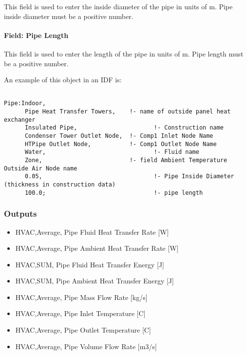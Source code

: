 This field is used to enter the inside diameter of the pipe in units of m. Pipe inside diameter must be a positive number.

\paragraph{Field: Pipe Length}\label{field-pipe-length-000}

This field is used to enter the length of the pipe in units of m. Pipe length must be a positive number.

An example of this object in an IDF is:

\begin{lstlisting}

Pipe:Indoor,
      Pipe Heat Transfer Towers,    !- name of outside panel heat exchanger
      Insulated Pipe,                      !- Construction name
      Condenser Tower Outlet Node,  !- Comp1 Inlet Node Name
      HTPipe Outlet Node,           !- Comp1 Outlet Node Name
      Water,                               !- Fluid name
      Zone,                         !- field Ambient Temperature Outside Air Node name
      0.05,                                !- Pipe Inside Diameter (thickness in construction data)
      100.0;                               !- pipe length
\end{lstlisting}

\subsubsection{Outputs}\label{outputs-6-005}

\begin{itemize}
\item
  HVAC,Average, Pipe Fluid Heat Transfer Rate {[}W{]}
\item
  HVAC,Average, Pipe Ambient Heat Transfer Rate {[}W{]}
\item
  HVAC,SUM, Pipe Fluid Heat Transfer Energy {[}J{]}
\item
  HVAC,SUM, Pipe Ambient Heat Transfer Energy {[}J{]}
\item
  HVAC,Average, Pipe Mass Flow Rate {[}kg/s{]}
\item
  HVAC,Average, Pipe Inlet Temperature {[}C{]}
\item
  HVAC,Average, Pipe Outlet Temperature {[}C{]}
\item
  HVAC,Average, Pipe Volume Flow Rate {[}m3/s{]}
\end{itemize}

